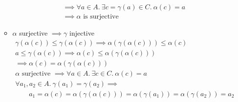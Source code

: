 \begin{exercise}
\begin{enumerate}[(1)]
\begin{itemize}
\begin{gather*}
                \implies \forall a \in A.\ \exists c = \gamma(a) \in C.\ \alpha(c) = a \\
                \implies \alpha \text{ is surjective}
            \end{gather*}
            \item $\alpha$ surjective $\implies \gamma$ injective
            \begin{gather*}
                \gamma(\alpha(c)) \leq \gamma(\alpha(c))
                \implies \alpha(\gamma(\alpha(c))) \leq \alpha(c) \\
                a \leq \gamma(\alpha(c))
                \implies \alpha(c) \leq \alpha(\gamma(\alpha(c))) \\
                \implies \alpha(c) = \alpha(\gamma(\alpha(c))) \\
                \alpha \text{ surjective } \implies \forall a \in A.\ \exists c \in C.\ \alpha(c) = a \\
                \forall a_1, a_2 \in A.\ \gamma(a_1) = \gamma(a_2) \implies \\
                \quad\quad a_1 = \alpha(c) = \alpha(\gamma(\alpha(c))) = \alpha(\gamma(a_1)) = \alpha(\gamma(a_2)) = a_2
            \end{gather*}
        \end{itemize}
    \end{enumerate}
\end{exercise}
